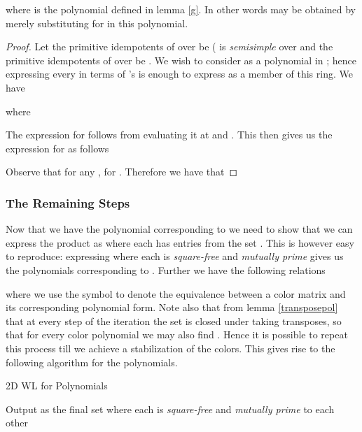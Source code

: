 	\begin{lemma}
		 where  is the polynomial defined in lemma \ref{g}. In other words  may be obtained by merely substituting 
		for  in this  polynomial.
	\end{lemma}


	\begin{proof}
		Let the primitive idempotents of  over  be  ( is \emph{semisimple} over  and the primitive idempotents of  over 
		 be . We wish to consider  as a polynomial in ; hence expressing every  in terms of 's is enough to express 
		as a member of this ring. We have

		

		where  

		

		The expression for  follows from evaluating it at  and . This then gives us the expression for  as follows

		

		Observe that for any ,  for . Therefore we have that 

		
	\end{proof}


	\subsubsection{The Remaining Steps}
	Now that we have the polynomial  corresponding to  we need to show that we can express the product as  where each  has entries from the set . This is however easy to reproduce: 
	expressing  where each  is \emph{square-free} and \emph{mutually prime} gives us the polynomials corresponding to . Further we have the following relations

	

	where we use the  symbol to denote the equivalence between a color matrix and its corresponding polynomial form. Note also that from lemma \ref{transposepol} that at every step of the iteration the set 
	is closed under taking transposes, so that for every color polynomial  we may also find . Hence it is possible to repeat this process till we achieve a stabilization of the
	colors. This gives rise to the following algorithm for the polynomials.

	\begin{algorithm}[H]
		\caption{2D WL for Polynomials}
		\label{polywl}
		\begin{algorithmic}
			\State 
			   \State Output  as the final set
			\Else
			   \State  where each  is \emph{square-free} and \emph{mutually prime} to each other
			   \State 
			   \While{}
			         \State 
				 \State 
			   \EndWhile
			\EndIf
			\EndWhile
		\end{algorithmic}
	\end{algorithm}

